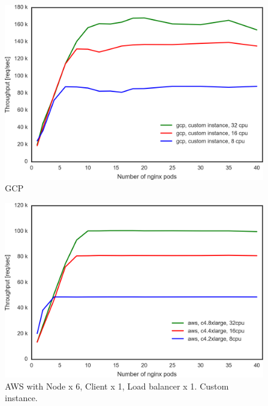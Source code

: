 \begin{figure}[t]
    \includegraphics[width=0.9\columnwidth]{Figs/gcp_all_ieice}
    \caption{GCP}
    \label{fig:gcp_all_ieice}
\end{figure}

\begin{figure}[t]
    \includegraphics[width=0.9\columnwidth]{Figs/aws_c4_ieice}
    \caption{AWS with Node x 6, Client x 1, Load balancer x 1. Custom instance. }
    \label{fig:aws_c4_ieice}
\end{figure}


